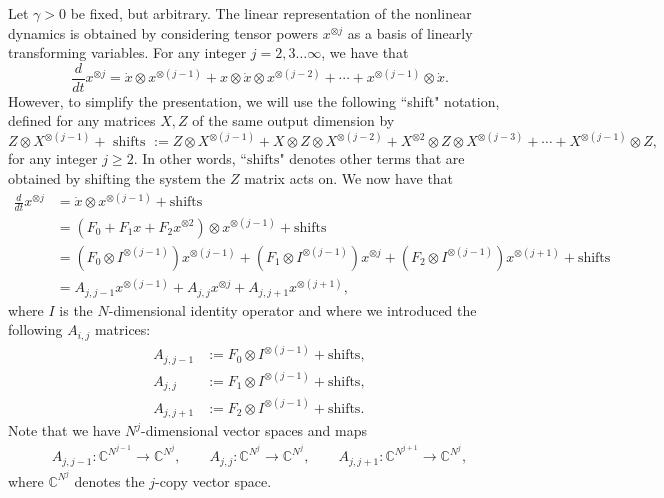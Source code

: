 \documentclass[superscriptaddress,onecolumn,nofootinbib,longbibliography,a4paper,accepted=2026-09-29]{quantumarticle}
\theoremstyle{plain}
\theoremstyle{definition}
\numberwithin{thm}{section}
\numberwithin{assumption}{section}
\numberwithin{lemma}{section}
\numberwithin{prop}{section}
\numberwithin{cor}{section}
\numberwithin{definition}{section}
\numberwithin{rmk}{section}
\numberwithin{equation}{section}
\newcommand{\ot}{\otimes}
\begin{document}
Let $\gamma >0$ be fixed, but arbitrary. The linear representation of the nonlinear dynamics is obtained by considering tensor powers $x^{\ot j}$ as a basis of linearly transforming variables. For any integer $j=2,3\dots \infty$, we have that
\begin{equation}
    \frac{d}{dt}{x}^{\ot j} = \dot{x} \otimes x^{\otimes (j-1)} + x\otimes \dot{x}\otimes x^{\otimes (j-2)} + \cdots +x^{\otimes (j-1)}\otimes \dot{x}.
\end{equation}
However, to simplify the presentation, we will use the following ``shift" notation, defined for any matrices $X,Z$ of the same output dimension by
\begin{equation}
   Z\otimes X^{\otimes (j-1)} + \mbox{ shifts } :=  Z\otimes X^{\otimes (j-1)} + X \otimes Z \otimes X^{\otimes (j-2)} + X^{\otimes 2} \otimes Z \otimes X^{\otimes (j-3)} + \cdots + X^{\otimes (j-1)} \otimes Z,
\end{equation}
for any integer $j\ge 2$. In other words, ``$\mbox{shifts}$" denotes other terms that are obtained by shifting the system the $Z$ matrix acts on. We now have that
\begin{equation}
\begin{aligned}
    \frac{d}{dt}{x}^{\ot j} &= \dot{x} \otimes x^{\otimes (j-1)} + \mbox{shifts}  \\
    &= (F_0+ F_1 x + F_2 x^{\otimes 2} ) \otimes x^{\otimes (j-1)} + \mbox{shifts}  \\
        &= (F_0 \otimes I^{\otimes (j-1)}) x^{\otimes (j-1)} + (F_1 \otimes I^{\otimes (j-1)} )x^{\otimes j} + (F_2 \otimes I^{\otimes (j-1)}) x^{\otimes (j+1)} + \mbox{shifts}  \\
        &= A_{j,j-1} x^{\otimes (j-1)} + A_{j,j}x^{\otimes j}+ A_{j,j+1} x^{\otimes (j+1)},
\end{aligned}
\end{equation}
where $I$ is the $N$-dimensional identity operator and where we introduced the following $A_{i,j}$ matrices:
\begin{subequations}  
\begin{align}
    A_{j,j-1}  &:= F_0\otimes I^{\otimes (j-1)} + \mbox{shifts}, \label{eq:A_F0} \\
    A_{j,j}  &:= F_1 \otimes I^{\otimes (j-1)}  + \mbox{shifts},  \label{eq:A_F1}\\
    A_{j,j+1}  &:=F_2\otimes I^{\otimes (j-1)}+ \mbox{shifts}.\label{eq:A_F2}
\end{align}
\end{subequations}
Note that we have $N^j$-dimensional vector spaces and maps
\begin{align}
    A_{j,j-1}: \mathbb{C}^{N^{j-1}} \rightarrow \mathbb{C}^{N^{j}}, \qquad A_{j,j}: \mathbb{C}^{N^{j}} \rightarrow \mathbb{C}^{N^{j}}, \qquad  A_{j,j+1}: \mathbb{C}^{N^{j+1}} \rightarrow \mathbb{C}^{N^{j}}, \label{eq:Amatricesdomains} 
\end{align}
where $\mathbb{C}^{N^{j}}$ denotes the $j$-copy vector space. 
\end{document}
